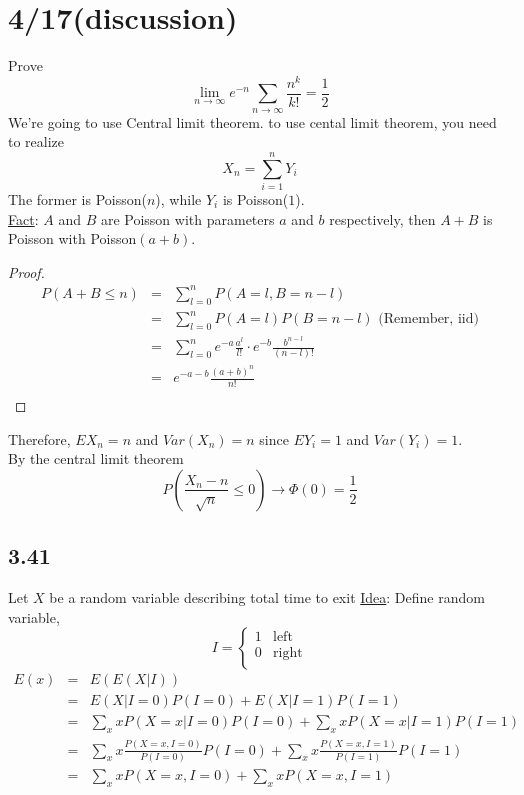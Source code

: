 \section*{4/17(discussion)}
  Prove
  $$
    \lim_{n \to \infty} e^{-n} \sum_{n \to \infty}\frac{n^k}{k!} = \frac{1}{2}
  $$
  We're going to use Central limit theorem. to use cental limit theorem,
  you need to realize
  $$
    X_n = \sum_{i = 1}^n Y_i
  $$
  The former is Poisson($n$), while $Y_i$ is Poisson($1$).\\
  \underline{Fact}: $A$ and $B$ are Poisson with parameters $a$ and $b$ 
    respectively, then $A+B$ is Poisson with Poisson$(a+b)$.\\
  \begin{proof}
    \begin{eqnarray*}
      P(A+B \le n) & = & \sum_{l = 0}^n P(A = l, B= n-l)\\
        & = & \sum_{l = 0}^n P(A = l)P(B= n-l) \text{ (Remember, iid)}\\
        & = & \sum_{l = 0}^n e^{-a}\frac{a^l}{l!} \cdot e^{-b}\frac{b^{n-l}}{(n-l)!}\\
        & = & e^{-a - b}\frac{(a+b)^n}{n!}\\
    \end{eqnarray*}
  \end{proof}
  Therefore, $EX_n = n$ and $Var(X_n) = n$ since $EY_i = 1$ and $Var(Y_i) = 
  1$.\\
  By the central limit theorem
  $$
    P\left(\frac{X_n -n}{\sqrt{n}} \le 0 \right) \to \Phi(0) = \frac{1}{2}
  $$

\subsection*{3.41}
  Let $X$ be a random variable describing total time to exit
  \underline{Idea}: Define random variable, 
  $$
    I = 
    \begin{cases}
      1 & \text{left}\\
      0 & \text{right}\\
    \end{cases}
  $$
  \begin{eqnarray*}
    E(x) & = & E(E(X |I))\\
      & = & E(X | I = 0)P(I = 0) + E(X |I = 1)P(I = 1)\\
      & = & \sum_{x}xP(X = x | I = 0)P(I = 0) + \sum_{x}xP(X = x | I = 1)P(I = 1)\\
      & = & \sum_{x}x\frac{P(X = x, I = 0)}{P(I = 0)}P(I = 0) + \sum_{x}x\frac{P(X = x, I = 1)}{P(I = 1)}P(I = 1)\\
      & = & \sum_{x}xP(X = x, I = 0) + \sum_{x}xP(X = x, I = 1)\\
  \end{eqnarray*}
